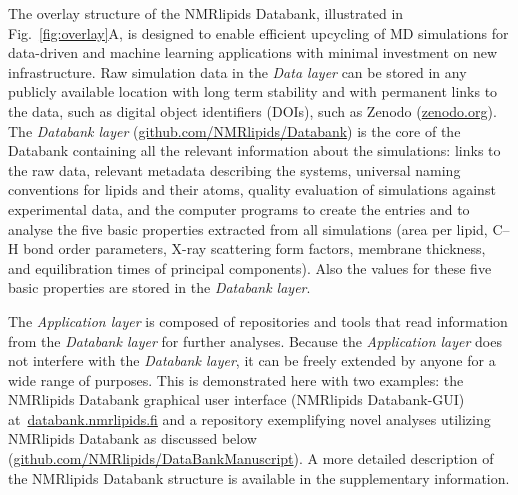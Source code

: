 \documentclass[fleqn,10pt]{wlscirep}
\begin{document}
The overlay structure of the NMRlipids Databank, illustrated in Fig.~\ref{fig:overlay}A, is designed to enable efficient upcycling of MD simulations for data-driven and machine learning applications with minimal investment on new infrastructure. Raw simulation data in the {\it Data layer} can be stored in any publicly available location with long term stability
and with permanent links to the data, such as digital object identifiers (DOIs), such as Zenodo (\href{https://zenodo.org}{zenodo.org}). 
The {\it Databank layer} (\href{https://github.com/NMRlipids/Databank}{github.com/NMRlipids/Databank}) is the core of the Databank containing all the relevant information about the simulations: links to the raw data, relevant metadata describing the systems, universal naming conventions for lipids and their atoms, quality evaluation of simulations against experimental data, and the computer programs to create the entries and to analyse the five basic properties extracted from all simulations (area per lipid, C--H bond order parameters, X-ray scattering form factors, membrane thickness, and equilibration times of principal components). Also the values for these five basic properties are stored in the {\it Databank layer}. 

The {\it Application layer} is composed of repositories and tools that read information from the {\it Databank layer} for further analyses. Because the {\it Application layer} does not interfere with the {\it Databank layer}, it can be freely extended by anyone for a wide range of purposes. This is demonstrated here with two examples: the NMRlipids Databank graphical user interface (NMRlipids Databank-GUI) at~\href{https://www.databank.nmrlipids.fi}{databank.nmrlipids.fi} and a repository exemplifying novel analyses utilizing NMRlipids Databank as discussed below (\href{https://github.com/NMRlipids/DataBankManuscript}{github.com/NMRlipids/DataBankManuscript}). A more detailed description of the NMRlipids Databank structure is available in the supplementary information. 
\end{document}

